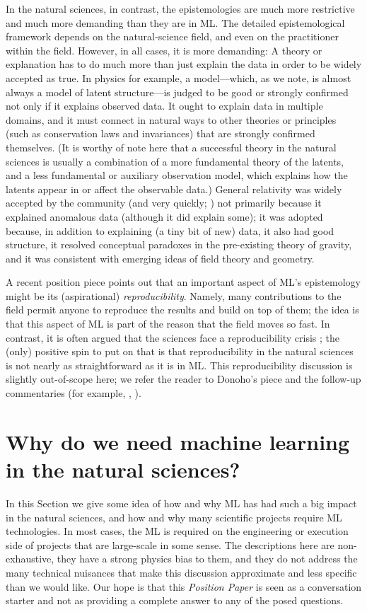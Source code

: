 \documentclass{article}
\newcommand{\documentname}{\textsl{Position Paper}}
\newcommand{\sectionname}{Section}
\begin{document}
In the natural sciences, in contrast, the epistemologies are much more restrictive and much more demanding than they are in ML.
The detailed epistemological framework depends on the natural-science field, and even on the practitioner within the field.
However, in all cases, it is more demanding:
A theory or explanation has to do much more than just explain the data in order to be widely accepted as true.
In physics for example, a model---which, as we note, is almost always a model of latent structure---is judged to be good or strongly confirmed not only if it explains observed data.
It ought to explain data in multiple domains, and it must connect in natural ways to other theories or principles (such as conservation laws and invariances) that are strongly confirmed themselves.
(It is worthy of note here that a successful theory in the natural sciences is usually a combination of a more fundamental theory of the latents, and a less fundamental or auxiliary observation model, which explains how the latents appear in or affect the observable data.)
General relativity \cite{gr} was widely accepted by the community (and very quickly; \citealt{peebles}) not primarily because it explained anomalous data (although it did explain some); it was adopted because, in addition to explaining (a tiny bit of new) data, it also had good structure, it resolved conceptual paradoxes in the pre-existing theory of gravity, and it was consistent with emerging ideas of field theory and geometry.

A recent position piece \citep{donoho2024data} points out that an important aspect of ML's epistemology might be its (aspirational) \emph{reproducibility}.
Namely, many contributions to the field permit anyone to reproduce the results and build on top of them; the idea is that
this aspect of ML is part of the reason that the field moves so fast.
In contrast, it is often argued that the sciences face a reproducibility crisis \cite{baker2016reproducibility};
the (only) positive spin to put on that is that reproducibility in the natural sciences is not nearly as straightforward as it is in ML.
This reproducibility discussion is slightly out-of-scope here; we refer the reader to Donoho's piece and the follow-up commentaries (for example, \citealt{Freire2024Singularity}, \citealt{Milanfar2024Data}).

\section{Why do we need machine learning in the natural sciences?}\label{sec:why}
In this \sectionname{} we give some idea of how and why ML has had such a big impact in the natural sciences, and how and why many scientific projects require ML technologies. 
In most cases, the ML is required on the engineering or execution side of projects that are large-scale in some sense.
The descriptions here are non-exhaustive, they have a strong physics bias to them, and they do not address the many technical nuisances that make this discussion approximate and less specific than we would like.
Our hope is that this \documentname{} is seen as a conversation starter and not as providing a complete answer to any of the posed questions.  
\end{document}
